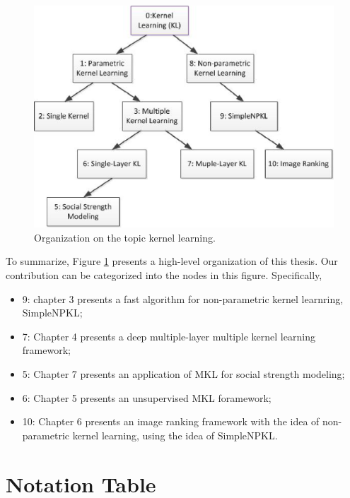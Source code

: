 \begin{figure}\label{fig:organization}
\begin{center}
\includegraphics[width = \linewidth]{figures/organization.eps}
\caption{Organization on the topic kernel learning.}
\end{center}
\end{figure}

To summarize, Figure \ref{fig:organization} presents a high-level organization of this thesis. Our contribution can be categorized into the nodes in this figure. Specifically, 
\begin{itemize}
  \item 9: chapter 3 presents a fast algorithm for non-parametric kernel learnring, SimpleNPKL;
  \item 7: Chapter 4 presents a deep multiple-layer multiple kernel learning framework;
  \item 5: Chapter 7 presents an application of MKL for social strength modeling;
  \item 6: Chapter 5 presents an unsupervised MKL foramework;
  \item 10: Chapter 6 presents an image ranking framework with the idea of non-parametric kernel learning, using the idea of SimpleNPKL.
\end{itemize}

\section{Notation Table}

